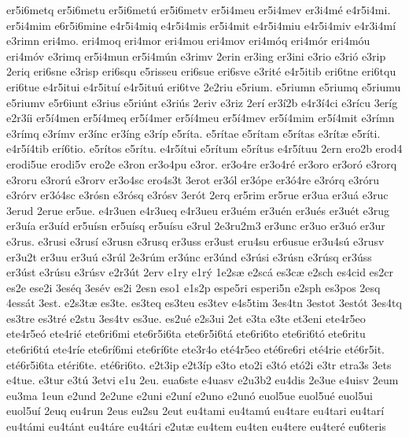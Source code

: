 {er5i6metq
er5i6metu
er5i6met^^fa
er5i6metv
er5i4meu
er5i4mev
er3i4m^^e9
e4r5i4mi.
er5i4mim
e6r5i6mine
e4r5i4miq
e4r5i4mis
er5i4mit
e4r5i4miu
e4r5i4miv
e4r3i4m^^ed
e3rimn
eri4mo.
eri4moq
eri4mor
eri4mou
eri4mov
eri4m^^f3q
eri4m^^f3r
eri4m^^f3u
eri4m^^f3v
e3rimq
er5i4mun
er5i4m^^fan
e3rimv
2erin
er3ing
er3ini
e3rio
e3ri^^f3
e3rip
2eriq
eri6sne
e3risp
eri6squ
e5risseu
eri6sue
eri6sve
e3rit^^e9
e4r5itib
eri6tne
eri6tqu
eri6tue
e4r5itui
e4r5itu^^ed
e4r5itu^^fa
eri6tve
2e2riu
e5rium.
e5riumn
e5riumq
e5riumu
e5riumv
e5r6iunt
e3rius
e5ri^^fant
e3ri^^fas
2eriv
e3riz
2er^^ed
er3^^ed2b
e4r3^^ed4ci
e3r^^edcu
3er^^edg
e2r3^^edi
er5^^ed4men
er5^^ed4meq
er5^^ed4mer
er5^^ed4meu
er5^^ed4mev
er5^^ed4mim
er5^^ed4mit
e3r^^edmn
e3r^^edmq
e3r^^edmv
er3^^ednc
er3^^edng
e3r^^edp
e5r^^edta.
e5r^^edtae
e5r^^edtam
e5r^^edtas
e3r^^edt^^e6
e5r^^edti.
e4r5^^ed4tib
er^^ed6tio.
e5r^^edtos
e5r^^edtu.
e4r5^^edtui
e5r^^edtum
e5r^^edtus
e4r5^^edtuu
2ern
ero2b
erod4
erodi5ue
erodi5v
ero2e
e3ron
er3o4pu
e3ror.
er3o4re
er3o4r^^e9
er3oro
er3or^^f3
e3rorq
e3roru
e3ror^^fa
e3rorv
er3o4sc
ero4s3t
3erot
er3^^f3l
er3^^f3pe
er3^^f34re
e3r^^f3rq
e3r^^f3ru
e3r^^f3rv
er3^^f34sc
e3r^^f3sn
e3r^^f3sq
e3r^^f3sv
3er^^f3t
2erq
er5rim
er5rue
er3ua
er3u^^e1
e3ruc
3erud
2erue
er5ue.
e4r3uen
e4r3ueq
e4r3ueu
er3u^^e9m
er3u^^e9n
er3u^^e9s
er3u^^e9t
e3rug
er3u^^eda
er3u^^edd
er5u^^edsn
er5u^^edsq
er5u^^edsu
e3rul
2e3ru2m3
er3unc
er3uo
er3u^^f3
er3ur
e3rus.
e3rusi
e3rus^^ed
e3rusn
e3rusq
er3uss
er3ust
eru4su
er6usue
er3u4s^^fa
e3rusv
er3u2t
er3uu
er3u^^fa
e3r^^fal
2e3r^^fam
er3^^fanc
er3^^fand
e3r^^fasi
e3r^^fasn
e3r^^fasq
er3^^fass
er3^^fast
e3r^^fasu
e3r^^fasv
e2r3^^fat
2erv
e1ry
e1r^^fd
1e2s^^e6
e2sc^^e1
es3c^^e6
e2sch
es4cid
es2cr
es2e
ese2i
3es^^e9q
3es^^e9v
es2i
2esn
eso1
e1s2p
espe5ri
esperi5n
e2sph
es3pos
2esq
4ess^^e1t
3est.
e2s3t^^e6
es3te.
es3teq
es3teu
es3tev
e4s5tim
3es4tn
3estot
3est^^f3t
3es4tq
es3tre
es3tr^^e9
e2stu
3es4tv
es3ue.
es2u^^e9
e2s3ui
2et
e3ta
e3te
et3eni
ete4r5eo
ete4r5e^^f3
ete4ri^^e9
ete6ri6mi
ete6r5i6ta
ete6r5i6t^^e1
ete6ri6to
ete6ri6t^^f3
ete6ritu
ete6ri6t^^fa
ete4r^^ede
ete6r^^ed6mi
ete6r^^ed6te
ete3r4o
et^^e94r5eo
et^^e96re6ri
et^^e94rie
et^^e96r5it.
et^^e96r5i6ta
et^^e9ri6te.
et^^e96ri6to.
e2t3ip
e2t3^^edp
e3to
eto2i
e3t^^f3
et^^f32i
e3tr
etra3s
3ets
e4tue.
e3tur
e3t^^fa
3etvi
e1u
2eu.
eua6ste
e4uasv
e2u3b2
eu4dis
2e3ue
e4uisv
2eum
eu3ma
1eun
e2und
2e2une
e2uni
e2un^^ed
e2uno
e2un^^f3
euol5ue
euol5u^^e9
euol5ui
euol5u^^ed
2euq
eu4run
2eus
eu2su
2eut
eu4tami
eu4tam^^fa
eu4tare
eu4tari
eu4tar^^ed
eu4t^^e1mi
eu4t^^e1nt
eu4t^^e1re
eu4t^^e1ri
e2ut^^e6
eu4tem
eu4ten
eu4tere
eu4ter^^e9
eu6teris
}
